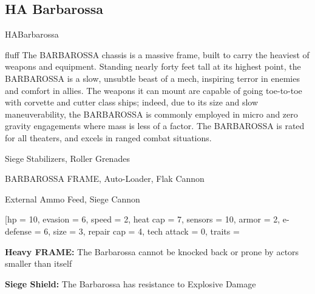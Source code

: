 \subsection{HA Barbarossa}

\begin{mech}{HA}{Barbarossa}

fluff{
The BARBAROSSA chassis is a massive frame, built to carry the heaviest of weapons and equipment. Standing nearly forty feet tall at its highest point, the BARBAROSSA is a slow, unsubtle beast of a mech, inspiring terror in enemies and comfort in allies. The weapons it can mount are capable of going toe-to-toe with corvette and cutter class ships; indeed, due to its size and slow maneuverability, the BARBAROSSA is commonly employed in micro and zero gravity engagements where mass is less of a factor. The BARBAROSSA is rated for all theaters, and excels in ranged combat situations.}

\begin{license}
\item Siege Stabilizers, Roller Grenades
\item BARBAROSSA FRAME, Auto-Loader, Flak Cannon
\item External Ammo Feed, Siege Cannon
\end{license}

\frameBox
[hp = 10,
evasion = 6,
speed = 2,
heat cap = 7,
sensors = 10,
armor = 2,
e-defense = 6,
size = 3,
repair cap = 4,
tech attack = 0,
traits = {\textbf{Heavy FRAME:} The Barbarossa cannot be knocked back or prone by actors smaller than itself

\textbf{Siege Shield:} The Barbarossa has resistance to Explosive Damage

}
\end{mech}
